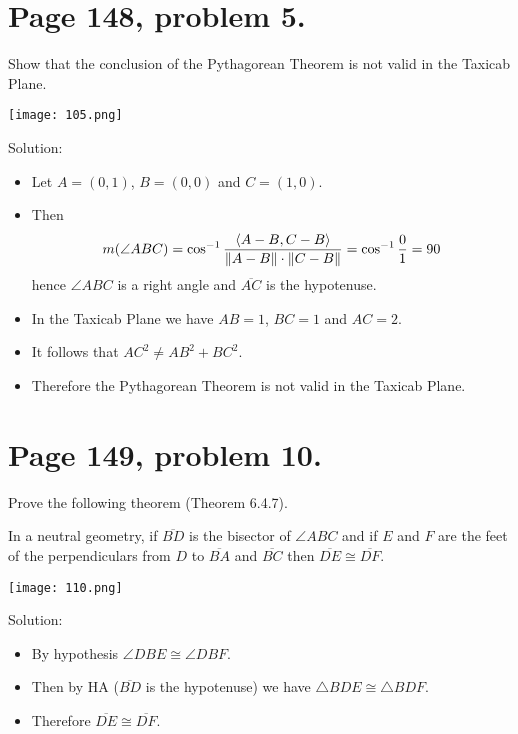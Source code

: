 \documentclass[12pt,openany]{report}
\begin{document}
\newpage

\section*{Page 148, problem 5.}

Show that the conclusion of the Pythagorean Theorem is not valid in the Taxicab Plane.

\texttt{[image: 105.png]}

\noindent
Solution:

\begin{itemize}

\item[]
Let $A=(0,1)$, $B=(0,0)$ and $C=(1,0)$.

\item[]
Then
$$m(\angle ABC)=\cos^{-1}{\langle A-B,C-B\rangle\over\|A-B\|\cdot\|C-B\|}
=\cos^{-1}{0\over1}=90$$
hence $\angle ABC$ is a right angle and $\overline{AC}$ is the hypotenuse.

\item[]
In the Taxicab Plane we have $AB=1$, $BC=1$ and $AC=2$.

\item[]
It follows that $AC^2\ne AB^2+BC^2$.

\item[]
Therefore the Pythagorean Theorem is not valid in the Taxicab Plane.

\end{itemize}

\newpage

\section*{Page 149, problem 10.}

Prove the following theorem (Theorem 6.4.7).

\medskip
\noindent
In a neutral geometry, if $\overline{BD}$ is the bisector of $\angle ABC$ and
if $E$ and $F$ are the feet of the perpendiculars from $D$ to $\overline{BA}$ and
$\overline{BC}$ then $\overline{DE}\cong\overline{DF}$.

\texttt{[image: 110.png]}

\noindent
Solution:

\begin{itemize}

\item[]
By hypothesis $\angle DBE\cong\angle DBF$.

\item[]
Then by HA ($\overline{BD}$ is the hypotenuse) we have $\triangle BDE\cong\triangle BDF$.

\item[]
Therefore $\overline{DE}\cong\overline{DF}$.

\end{itemize}
\end{document}

